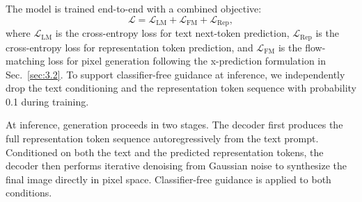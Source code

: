 The model is trained end-to-end with a combined objective:
\begin{equation}
    \mathcal{L} = \mathcal{L}_{\text{LM}} + \mathcal{L}_{\text{FM}} + \mathcal{L}_{\text{Rep}},
\end{equation}
where $\mathcal{L}_{\text{LM}}$ is the cross-entropy loss for text next-token prediction, $\mathcal{L}_{\text{Rep}}$ is the cross-entropy loss for representation token prediction, and $\mathcal{L}_{\text{FM}}$ is the flow-matching loss for pixel generation following the x-prediction formulation in Sec.~\ref{sec:3.2}. To support classifier-free guidance at inference, we independently drop the text conditioning and the representation token sequence with probability 0.1 during training.

At inference, generation proceeds in two stages. The decoder first produces the full representation token sequence autoregressively from the text prompt. Conditioned on both the text and the predicted representation tokens, the decoder then performs iterative denoising from Gaussian noise to synthesize the final image directly in pixel space. Classifier-free guidance is applied to both conditions.
